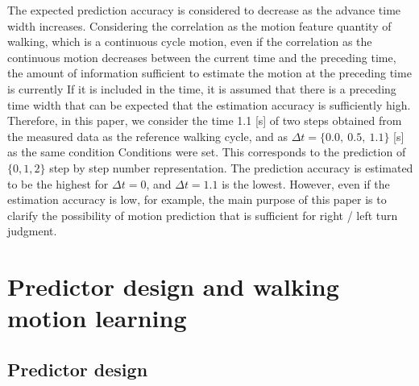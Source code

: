 \documentclass{sigchi}
\begin{document}
The expected prediction accuracy is considered to decrease as the advance time width increases. Considering the correlation as the motion feature quantity of walking, which is a continuous cycle motion, even if the correlation as the continuous motion decreases between the current time and the preceding time, the amount of information sufficient to estimate the motion at the preceding time is currently If it is included in the time, it is assumed that there is a preceding time width that can be expected that the estimation accuracy is sufficiently high. Therefore, in this paper, we consider the time 1.1 [s] of two steps obtained from the measured data as the reference walking cycle, and as $ \Delta t = \{0.0, \ 0.5, \ 1.1 \} $ [s] as the same condition Conditions were set. This corresponds to the prediction of $ \{0, 1, 2\} $ step by step number representation. The prediction accuracy is estimated to be the highest for $ \Delta t = 0 $, and $ \Delta t = 1.1 $ is the lowest. However, even if the estimation accuracy is low, for example, the main purpose of this paper is to clarify the possibility of motion prediction that is sufficient for right / left turn judgment.

\section{Predictor design and walking motion learning}%

\subsection{Predictor design}
\end{document}
